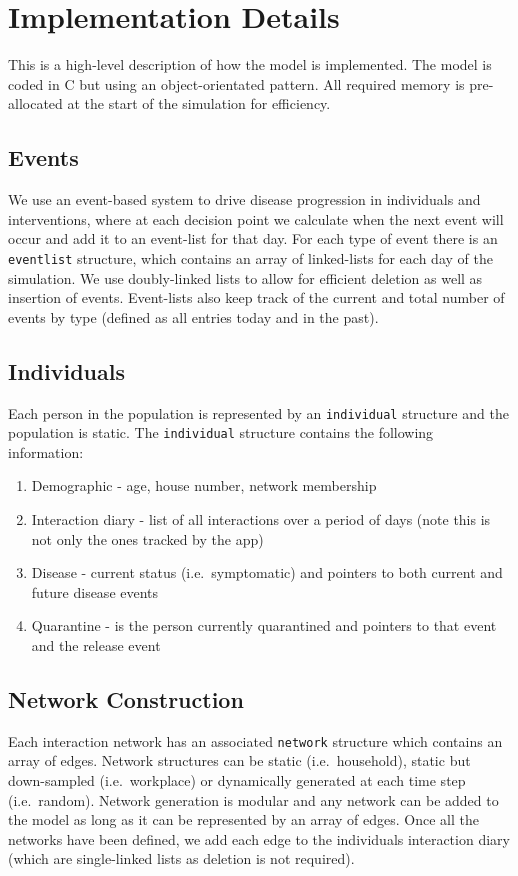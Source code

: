 \documentclass[12pt, oneside]{amsart}   	%
\begin{document}
\section{Implementation Details}\label{section_ibm_implementation}
This is a high-level description of how the model is implemented.
The model is coded in C but using an object-orientated pattern.
All required memory is pre-allocated at the start of the simulation for efficiency.

\subsection{Events} \label{section_ibm_implementation_events}
We use an event-based system to drive disease progression in individuals and interventions, where at each decision point we calculate when the next event will occur and add it to an event-list for that day.
For each type of event there is an \texttt{eventlist} structure, which contains an array of linked-lists for each day of the simulation.
We use doubly-linked lists to allow for efficient deletion as well as insertion of events.
Event-lists also keep track of the current and total number of events by type (defined as all entries today and in the past). 

\subsection{Individuals} \label{section_ibm_implementation_individuals}
Each person in the population is represented by an \texttt{individual} structure and the population is static.
The \texttt{individual} structure contains the following information:
\begin{enumerate}
\item Demographic - age, house number, network membership
\item Interaction diary - list of all interactions over a period of days (note this is not only the ones tracked by the app)
\item Disease - current status (i.e.\ symptomatic) and pointers to both current and future disease events
\item Quarantine - is the person currently quarantined and pointers to that event and the release event
\end{enumerate}

\subsection{Network Construction}\label{section_ibm_implementation_network}
Each interaction network has an associated \texttt{network} structure which contains an array of edges.
Network structures can be static (i.e.\ household), static but down-sampled (i.e.\ workplace) or dynamically generated at each time step (i.e.\ random).
Network generation is modular and any network can be added to the model as long as it can be represented by an array of edges.
Once all the networks have been defined, we add each edge to the individuals interaction diary (which are single-linked lists as deletion is not required).
\end{document}

